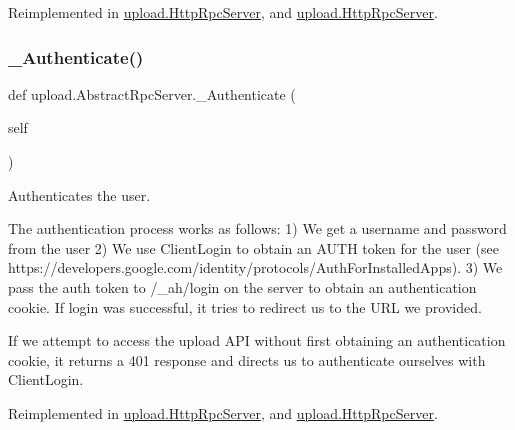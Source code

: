 Reimplemented in \mbox{\hyperlink{classupload_1_1_http_rpc_server_ab46a30c5aaa9f4d8f5a4bcb32293010e}{upload.\+Http\+Rpc\+Server}}, and \mbox{\hyperlink{classupload_1_1_http_rpc_server_ab46a30c5aaa9f4d8f5a4bcb32293010e}{upload.\+Http\+Rpc\+Server}}.

\mbox{\label{classupload_1_1_abstract_rpc_server_a8517a9d90ee2478752a53302f01d868d}} 
\subsubsection{\texorpdfstring{\_Authenticate()}{\_Authenticate()}\hspace{0.1cm}{\footnotesize\ttfamily [2/2]}}
{\footnotesize\ttfamily def upload.\+Abstract\+Rpc\+Server.\+\_\+\+Authenticate (\begin{DoxyParamCaption}\item[{}]{self }\end{DoxyParamCaption})\hspace{0.3cm}{\ttfamily [private]}}

\begin{DoxyVerb}Authenticates the user.

The authentication process works as follows:
 1) We get a username and password from the user
 2) We use ClientLogin to obtain an AUTH token for the user
(see https://developers.google.com/identity/protocols/AuthForInstalledApps).
 3) We pass the auth token to /_ah/login on the server to obtain an
authentication cookie. If login was successful, it tries to redirect
us to the URL we provided.

If we attempt to access the upload API without first obtaining an
authentication cookie, it returns a 401 response and directs us to
authenticate ourselves with ClientLogin.
\end{DoxyVerb}
 

Reimplemented in \mbox{\hyperlink{classupload_1_1_http_rpc_server_ab46a30c5aaa9f4d8f5a4bcb32293010e}{upload.\+Http\+Rpc\+Server}}, and \mbox{\hyperlink{classupload_1_1_http_rpc_server_ab46a30c5aaa9f4d8f5a4bcb32293010e}{upload.\+Http\+Rpc\+Server}}.

\mbox{\label{classupload_1_1_abstract_rpc_server_a1553c79619eec0770932cd4fa325243c}} 
